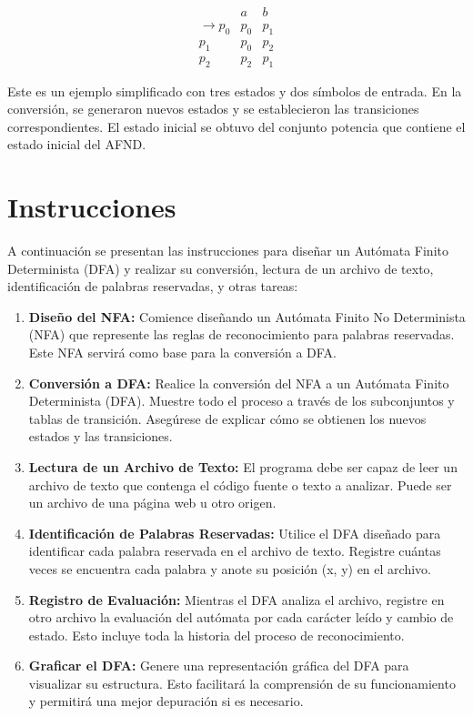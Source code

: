 \documentclass[11pt]{article} %
\begin{document}
	\[
	\begin{matrix}
		& a & b \\
		\rightarrow p_0 & p_0 & p_1 \\
		p_1 & p_0 & p_2 \\
		p_2 & p_2 & p_1
	\end{matrix}
	\]
	
	Este es un ejemplo simplificado con tres estados y dos símbolos de entrada. En la conversión, se generaron nuevos estados y se establecieron las transiciones correspondientes. El estado inicial se obtuvo del conjunto potencia que contiene el estado inicial del AFND.
	

	
	\section{Instrucciones}
	
	A continuación se presentan las instrucciones para diseñar un Autómata Finito Determinista (DFA) y realizar su conversión, lectura de un archivo de texto, identificación de palabras reservadas, y otras tareas:
	
	\begin{enumerate}
		\item \textbf{Diseño del NFA:} Comience diseñando un Autómata Finito No Determinista (NFA) que represente las reglas de reconocimiento para palabras reservadas. Este NFA servirá como base para la conversión a DFA.
		
		\item \textbf{Conversión a DFA:} Realice la conversión del NFA a un Autómata Finito Determinista (DFA). Muestre todo el proceso a través de los subconjuntos y tablas de transición. Asegúrese de explicar cómo se obtienen los nuevos estados y las transiciones.
		
		\item \textbf{Lectura de un Archivo de Texto:} El programa debe ser capaz de leer un archivo de texto que contenga el código fuente o texto a analizar. Puede ser un archivo de una página web u otro origen.
		
		\item \textbf{Identificación de Palabras Reservadas:} Utilice el DFA diseñado para identificar cada palabra reservada en el archivo de texto. Registre cuántas veces se encuentra cada palabra y anote su posición (x, y) en el archivo.
		
		\item \textbf{Registro de Evaluación:} Mientras el DFA analiza el archivo, registre en otro archivo la evaluación del autómata por cada carácter leído y cambio de estado. Esto incluye toda la historia del proceso de reconocimiento.
		
		\item \textbf{Graficar el DFA:} Genere una representación gráfica del DFA para visualizar su estructura. Esto facilitará la comprensión de su funcionamiento y permitirá una mejor depuración si es necesario.
	\end{enumerate}
	
\end{document}
